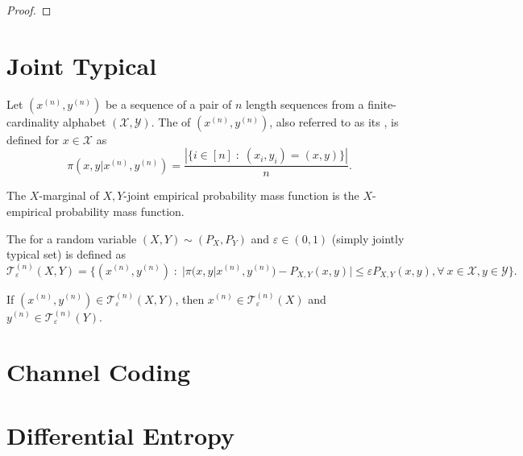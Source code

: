 \documentclass[11pt,a4paper]{article}
\begin{document}
\begin{proof}

\end{proof}

\section{Joint Typical}

\begin{definition}
    Let $(x^{(n)}, y^{(n)})$ be a sequence of a pair of $n$ length sequences from a finite-cardinality alphabet $(\mathcal{X},\mathcal{Y})$. The  of $(x^{(n)}, y^{(n)})$, also referred to as its , is defined for $x\in \mathcal{X}$ as
    \begin{equation*}
        \pi(x,y|x^{(n)}, y^{(n)}) = \dfrac{|\{i\in [n]\;:\;(x_i,y_i) = (x,y)\}|}{n}.
    \end{equation*}
\end{definition}

\begin{remark}
    The $X$-marginal of $X,Y$-joint empirical probability mass function is the $X$-empirical probability mass function.
\end{remark}

\begin{definition}
    The  for a random variable $(X,Y)\sim (P_X,P_Y)$ and $\varepsilon \in (0,1)$ (simply jointly typical set) is defined as
    \begin{equation*}
        \mathcal{T}^{(n)}_\varepsilon (X,Y) = \{(x^{(n)},y^{(n)})\;:\; |\pi(x,y|x^{(n)},y^{(n)}) - P_{X,Y}(x,y)| \le \varepsilon P_{X,Y}(x,y), \forall\ x\in\mathcal{X}, y\in\mathcal{Y}\}.
    \end{equation*}
\end{definition}

\begin{remark}
    If $(x^{(n)},y^{(n)})\in \mathcal{T}_\varepsilon^{(n)}(X,Y)$, then $x^{(n)}\in \mathcal{T}_\varepsilon^{(n)}(X)$ and $y^{(n)}\in \mathcal{T}_\varepsilon^{(n)}(Y)$.
\end{remark}

\section{Channel Coding}

\section{Differential Entropy}
\end{document}
